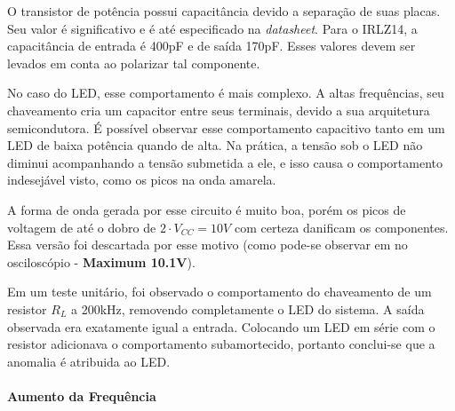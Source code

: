	O transistor de potência possui capacitância devido a separação de suas placas. Seu valor é significativo e é até especificado na \textit{datasheet}. Para o IRLZ14, a capacitância de entrada é 400pF e de saída 170pF. Esses valores devem ser levados em conta ao polarizar tal componente. 

	No caso do LED, esse comportamento é mais complexo. A altas frequências, seu chaveamento cria um capacitor entre seus terminais, devido a sua arquitetura semicondutora. É possível observar esse comportamento capacitivo tanto em um LED de baixa potência quando de alta. Na prática, a tensão sob o LED não diminui acompanhando a tensão submetida a ele, e isso causa o comportamento indesejável visto, como os picos na onda amarela.
	
	A forma de onda gerada por esse circuito é muito boa, porém os picos de voltagem de até o dobro de $2 \cdot V_{CC} = 10V$ com certeza danificam os componentes. Essa versão foi descartada por esse motivo (como pode-se observar em no osciloscópio - \textbf{Maximum 10.1V}). 
	
	Em um teste unitário, foi observado o comportamento do chaveamento de um resistor $R_{L}$ a 200kHz, removendo completamente o LED do sistema. A saída observada era exatamente igual a entrada. Colocando um LED em série com o resistor adicionava o comportamento subamortecido, portanto conclui-se que a anomalia é atribuida ao LED.
	
	\paragraph{Aumento da Frequência}

